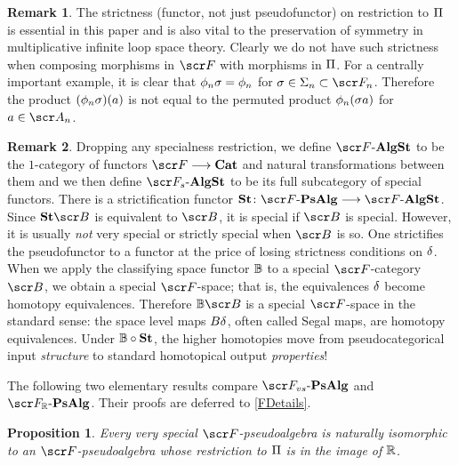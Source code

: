\documentclass{amsart}
\newtheorem{prop}{Proposition}[section]
\theoremstyle{definition}
\newtheorem{defn}{Definition}[section]
\newtheorem{rem}{Remark}[section]
\numberwithin{equation}{section}
\newcommand{\FP}{\sF\text{-}\mathbf{PsAlg}}
\newcommand{\FPs}{\sF_{vs}\text{-}\mathbf{PsAlg}}
\newcommand{\FPR}{\sF_{\bR}\text{-}\mathbf{PsAlg}}
\begin{document}
\begin{rem}\label{example}
The strictness (functor, not just pseudofunctor) on restriction to $\Pi$ is essential in this paper and is also vital to the preservation of symmetry in multiplicative infinite loop space theory.  Clearly we do not have such strictness when composing morphisms in $\sF$ with morphisms in $\Pi$.  For a centrally important example, it is clear that  $\phi_n\sigma = \phi_n$ for $\si\in \SI_n\subset \sF_n$. Therefore the product $(\phi_n\sigma)(a)$ is not equal to the permuted product $\phi_n(\sigma a)$ for $a\in \sA_n$. 
\end{rem}

\begin{rem}\label{clarity} Dropping any specialness restriction, we define $\sF\text{-}\bf{AlgSt}$ to be the $1$-category of functors $\sF \rtarr \bf{Cat}$ and natural transformations between them and we then define $\sF_{s}\text{-}\bf{AlgSt}$ to be its full subcategory of special functors.  There is a strictification functor 
$\mathbf{St}\colon \FP \rtarr \sF\text{-}\bf{AlgSt}$.  Since $\mathbf{St}\sB$ is equivalent to $\sB$, it is special if $\sB$ is special.  However,
it is usually {\em{not}} very special or strictly special when $\sB$ is so.  One strictifies the pseudofunctor to a functor at the price of losing strictness conditions on $\delta$. 
When we apply the classifying space functor $\mathbb{B}$ to a special $\sF$-category $\sB$, we obtain a special $\sF$-space; that is, the equivalences $\delta$ become homotopy equivalences.  Therefore $\bB\sB$ is a special $\sF$-space in the standard sense: the space level maps $B\delta$, often called Segal maps,  are homotopy equivalences.   Under $\mathbb{B}\circ \bf{St}$, the higher homotopies move from pseudocategorical input {\em{structure}} to standard homotopical output {\em{properties}}! 
\end{rem}


The following two elementary results compare $\FPs$ and $\FPR$.   Their proofs are deferred to \autoref{FDetails}.  

\begin{prop} \label{ImageOfRPSAlg}
Every very special $\sF$-pseudoalgebra is naturally isomorphic to an $\sF$-pseudoalgebra whose restriction to $\Pi$ is in the image of $\mathbb{R}$.
\end{prop}
\end{document}
